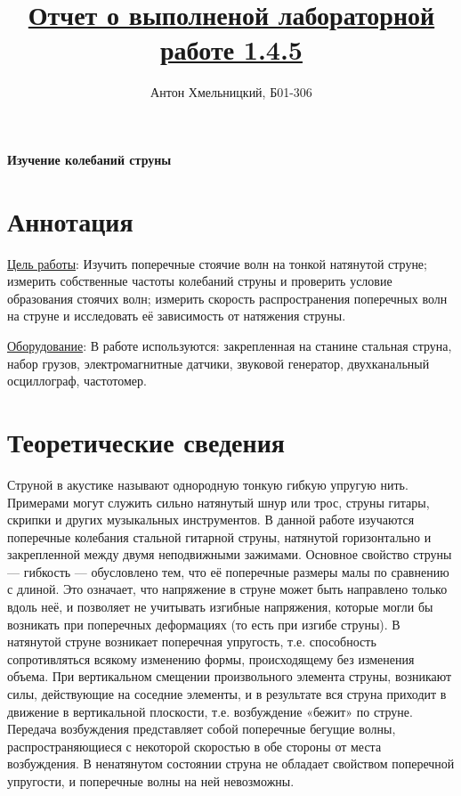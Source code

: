 \documentclass[a4paper]{article}
\title{\underline{Отчет о выполненой лабораторной работе 1.4.5}}
\author{Антон Хмельницкий, Б01-306}
\begin{document}
\maketitle
\begin{center}\textbf{Изучение колебаний струны}\end{center}

\section{Аннотация}
\underline{Цель работы}: 
Изучить поперечные стоячие волн на тонкой натянутой струне; измерить собственные частоты колебаний струны и проверить условие образования стоячих волн; измерить скорость распространения поперечных волн на струне и исследовать её зависимость от натяжения струны.

\underline{Оборудование}: 
В работе используются: закрепленная на станине стальная струна, набор грузов, электромагнитные датчики, звуковой генератор, двухканальный осциллограф, частотомер.

\section{Теоретические сведения}\par

Струной в акустике называют однородную тонкую гибкую упругую нить. Примерами могут служить сильно натянутый шнур или трос, струны гитары, скрипки и других музыкальных инструментов. В данной работе изучаются поперечные колебания стальной гитарной струны, натянутой горизонтально и закрепленной между двумя неподвижными зажимами. Основное свойство струны — гибкость — обусловлено тем, что её поперечные размеры малы по сравнению с длиной. Это означает, что напряжение в струне может быть направлено только вдоль неё, и позволяет не учитывать изгибные напряжения, которые могли бы возникать при поперечных деформациях (то есть при изгибе струны).
В натянутой струне возникает поперечная упругость, т.е. способность сопротивляться всякому изменению формы, происходящему без изменения объема. При вертикальном смещении произвольного элемента струны, возникают силы, действующие на соседние элементы, и в результате вся струна приходит в движение в вертикальной плоскости, т.е. возбуждение «бежит» по струне. Передача возбуждения представляет собой поперечные бегущие волны, распространяющиеся с некоторой скоростью в обе стороны от места возбуждения. В ненатянутом состоянии струна не обладает свойством поперечной упругости, и поперечные волны на ней невозможны.
\end{document}
